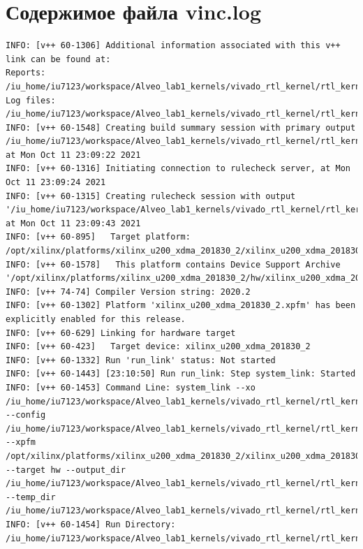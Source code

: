 \section{Содержимое файла vinc.log}

\begin{lstlisting}
INFO: [v++ 60-1306] Additional information associated with this v++ link can be found at:
Reports: /iu_home/iu7123/workspace/Alveo_lab1_kernels/vivado_rtl_kernel/rtl_kernel_wizard_2_ex/exports/_x/reports/link
Log files: /iu_home/iu7123/workspace/Alveo_lab1_kernels/vivado_rtl_kernel/rtl_kernel_wizard_2_ex/exports/_x/logs/link
INFO: [v++ 60-1548] Creating build summary session with primary output /iu_home/iu7123/workspace/Alveo_lab1_kernels/vivado_rtl_kernel/rtl_kernel_wizard_2_ex/exports/vinc.xclbin.link_summary, at Mon Oct 11 23:09:22 2021
INFO: [v++ 60-1316] Initiating connection to rulecheck server, at Mon Oct 11 23:09:24 2021
INFO: [v++ 60-1315] Creating rulecheck session with output '/iu_home/iu7123/workspace/Alveo_lab1_kernels/vivado_rtl_kernel/rtl_kernel_wizard_2_ex/exports/_x/reports/link/v++_link_vinc_guidance.html', at Mon Oct 11 23:09:43 2021
INFO: [v++ 60-895]   Target platform: /opt/xilinx/platforms/xilinx_u200_xdma_201830_2/xilinx_u200_xdma_201830_2.xpfm
INFO: [v++ 60-1578]   This platform contains Device Support Archive '/opt/xilinx/platforms/xilinx_u200_xdma_201830_2/hw/xilinx_u200_xdma_201830_2.dsa'
INFO: [v++ 74-74] Compiler Version string: 2020.2
INFO: [v++ 60-1302] Platform 'xilinx_u200_xdma_201830_2.xpfm' has been explicitly enabled for this release.
INFO: [v++ 60-629] Linking for hardware target
INFO: [v++ 60-423]   Target device: xilinx_u200_xdma_201830_2
INFO: [v++ 60-1332] Run 'run_link' status: Not started
INFO: [v++ 60-1443] [23:10:50] Run run_link: Step system_link: Started
INFO: [v++ 60-1453] Command Line: system_link --xo /iu_home/iu7123/workspace/Alveo_lab1_kernels/vivado_rtl_kernel/rtl_kernel_wizard_2_ex/exports/rtl_kernel_wizard_2.xo --config /iu_home/iu7123/workspace/Alveo_lab1_kernels/vivado_rtl_kernel/rtl_kernel_wizard_2_ex/exports/_x/link/int/syslinkConfig.ini --xpfm /opt/xilinx/platforms/xilinx_u200_xdma_201830_2/xilinx_u200_xdma_201830_2.xpfm --target hw --output_dir /iu_home/iu7123/workspace/Alveo_lab1_kernels/vivado_rtl_kernel/rtl_kernel_wizard_2_ex/exports/_x/link/int --temp_dir /iu_home/iu7123/workspace/Alveo_lab1_kernels/vivado_rtl_kernel/rtl_kernel_wizard_2_ex/exports/_x/link/sys_link
INFO: [v++ 60-1454] Run Directory: /iu_home/iu7123/workspace/Alveo_lab1_kernels/vivado_rtl_kernel/rtl_kernel_wizard_2_ex/exports/_x/link/run_link

\end{lstlisting}
